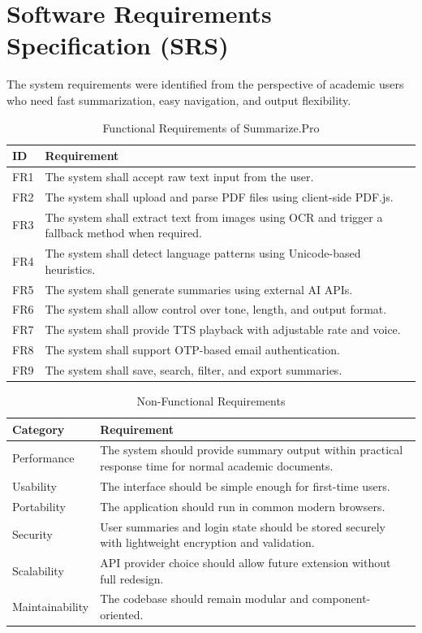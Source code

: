 \documentclass[12pt, a4paper]{report}
\begin{document}
\section{Software Requirements Specification (SRS)}
The system requirements were identified from the perspective of academic users who need fast summarization, easy navigation, and output flexibility.

\begin{table}[H]
  \centering
  \caption{Functional Requirements of Summarize.Pro}
  \begin{tabular}{|p{2cm}|p{10.5cm}|}
    \hline
    \textbf{ID} & \textbf{Requirement} \\
    \hline
    FR1 & The system shall accept raw text input from the user. \\
    \hline
    FR2 & The system shall upload and parse PDF files using client-side PDF.js. \\
    \hline
    FR3 & The system shall extract text from images using OCR and trigger a fallback method when required. \\
    \hline
    FR4 & The system shall detect language patterns using Unicode-based heuristics. \\
    \hline
    FR5 & The system shall generate summaries using external AI APIs. \\
    \hline
    FR6 & The system shall allow control over tone, length, and output format. \\
    \hline
    FR7 & The system shall provide TTS playback with adjustable rate and voice. \\
    \hline
    FR8 & The system shall support OTP-based email authentication. \\
    \hline
    FR9 & The system shall save, search, filter, and export summaries. \\
    \hline
  \end{tabular}
\end{table}

\begin{table}[H]
  \centering
  \caption{Non-Functional Requirements}
  \begin{tabular}{|p{2.5cm}|p{10cm}|}
    \hline
    \textbf{Category} & \textbf{Requirement} \\
    \hline
    Performance & The system should provide summary output within practical response time for normal academic documents. \\
    \hline
    Usability & The interface should be simple enough for first-time users. \\
    \hline
    Portability & The application should run in common modern browsers. \\
    \hline
    Security & User summaries and login state should be stored securely with lightweight encryption and validation. \\
    \hline
    Scalability & API provider choice should allow future extension without full redesign. \\
    \hline
    Maintainability & The codebase should remain modular and component-oriented. \\
    \hline
  \end{tabular}
\end{table}
\end{document}
